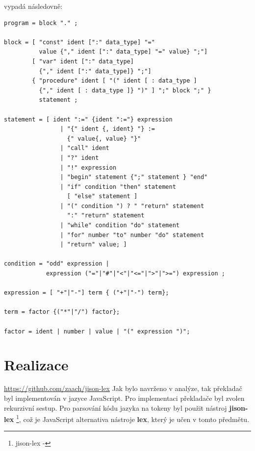 \documentclass[12pt, letterpaper]{article}
\begin{document}
vypadá následovně:
\begin{lstlisting}[caption=Navržená gramatika rozšiřující PL/0, captionpos=b]
program = block "." ;

block = [ "const" ident [":" data_type] "=" 
          value {"," ident [":" data_type] "=" value} ";"]
        [ "var" ident [":" data_type] 
          {"," ident [":" data_type]} ";"]
        { "procedure" ident [ "(" ident [ : data_type ] 
          {"," ident [ : data_type ]} ")" ] ";" block ";" } 
          statement ;

statement = [ ident ":=" {ident ":="} expression 
                | "{" ident {, ident} "} := 
                  {" value{, value} "}" 
                | "call" ident
                | "?" ident
                | "!" expression 
                | "begin" statement {";" statement } "end" 
                | "if" condition "then" statement 
                  [ "else" statement ]
                | "(" condition ") ? " "return" statement 
                  ":" "return" statement
                | "while" condition "do" statement
                | "for" number "to" number "do" statement
                | "return" value; ]

condition = "odd" expression |
            expression ("="|"#"|"<"|"<="|">"|">=") expression ;

expression = [ "+"|"-"] term { ("+"|"-") term};

term = factor {("*"|"/") factor};

factor = ident | number | value | "(" expression ")";
\end{lstlisting}
%
\section{Realizace}
\urldef{\urlB}\url{https://github.com/zaach/jison-lex}
Jak bylo navrženo v analýze, tak překladač byl implementován v jazyce JavaScript. Pro implementaci překladače byl
zvolen rekurzivní sestup. Pro parsování kódu jazyka na tokeny byl použit nástroj \textbf{jison-lex}
\footnote{jison-lex - \urlB}, což je JavaScript alternativa nástroje \textbf{lex}, který je učen v tomto předmětu.
\end{document}
